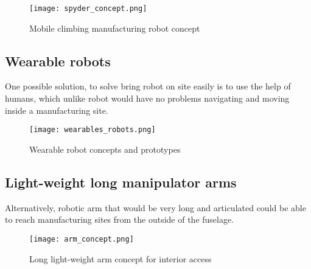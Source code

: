 \begin{figure}[H]
	\centering
		\texttt{[image: spyder\_concept.png]}
		\caption{Mobile climbing manufacturing robot concept}
	\label{fig:arm_concept}
\end{figure}


\subsection{Wearable robots}
\label{sec:WearableRobots}

One possible solution, to solve bring robot on site easily is to use the help of humans, which unlike robot would have no problems navigating and moving inside a manufacturing site.

\begin{figure}[H]
	\centering
		\texttt{[image: wearables\_robots.png]}
		\caption{Wearable robot concepts and prototypes}
	\label{fig:wearable_concept}
\end{figure}


\subsection{Light-weight long manipulator arms}
\label{sec:LightWeightLongManipulatorArm}

Alternatively, robotic arm that would be very long and articulated could be able to reach manufacturing sites from the outside of the fuselage. 

\begin{figure}[H]
	\centering
		\texttt{[image: arm\_concept.png]}
		\caption{Long light-weight arm concept for interior access}
	\label{fig:arm_concept}
\end{figure}